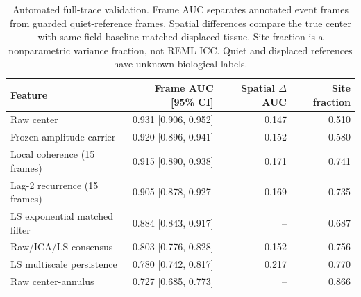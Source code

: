 \begin{table}[!htbp]
\centering
\scriptsize
\begin{tabularx}{\linewidth}{X r r r}
\toprule
Feature & Frame AUC [95\% CI] & Spatial $\Delta$ AUC & Site fraction \\
\midrule
Raw center & 0.931 [0.906, 0.952] & 0.147 & 0.510 \\
Frozen amplitude carrier & 0.920 [0.896, 0.941] & 0.152 & 0.580 \\
Local coherence (15 frames) & 0.915 [0.890, 0.938] & 0.171 & 0.741 \\
Lag-2 recurrence (15 frames) & 0.905 [0.878, 0.927] & 0.169 & 0.735 \\
LS exponential matched filter & 0.884 [0.843, 0.917] & -- & 0.687 \\
Raw/ICA/LS consensus & 0.803 [0.776, 0.828] & 0.152 & 0.756 \\
LS multiscale persistence & 0.780 [0.742, 0.817] & 0.217 & 0.770 \\
Raw center-annulus & 0.727 [0.685, 0.773] & -- & 0.866 \\
\bottomrule
\end{tabularx}
\caption{Automated full-trace validation. Frame AUC separates annotated event frames from guarded quiet-reference frames. Spatial differences compare the true center with same-field baseline-matched displaced tissue. Site fraction is a nonparametric variance fraction, not REML ICC. Quiet and displaced references have unknown biological labels.}
\label{tab:automated-feature-validation}
\end{table}
